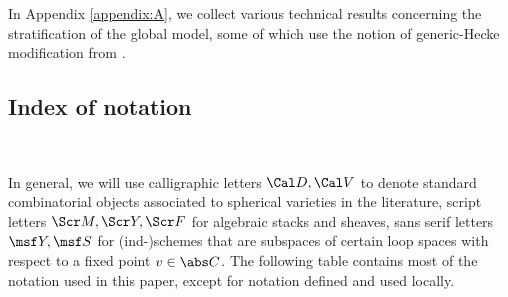 \documentclass[final]{amsart}
\theoremstyle{remark}
\theoremstyle{definition}
\numberwithin{equation}{section}
\begin{document}
In Appendix \ref{appendix:A}, we collect various technical results 
concerning the stratification of the global model, some of which use the
notion of generic-Hecke modification from \cite{GN}. 


\subsection{Index of notation}\  

In general, we will use calligraphic 
letters $\Cal D, \Cal V$ to denote standard combinatorial objects associated
to spherical varieties in the literature, script letters $\Scr M, \Scr Y, \Scr F$ for
algebraic stacks and sheaves, sans serif letters $\msf Y, \msf S$ for (ind-)schemes 
that are subspaces of certain loop spaces with respect to a fixed point $v\in \abs C$. The following table contains most of the notation used in this paper, except for notation defined and used locally.
\end{document}
